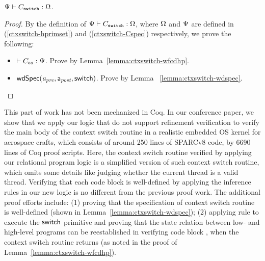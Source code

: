 \begin{theorem}
    \em
    ${\Psi} \vdash {C_{\texttt{switch}}} : {\Omega}$.
\end{theorem}
\begin{proof}
    By the definition of
    ${\Psi} \vdash {C_{\texttt{switch}}} : {\Omega}$,
    where $\Omega$ and $\Psi{}$ are defined in
    (\ref{ctxswitch-hprimset}) and (\ref{ctxswitch-Cspec})
    respectively, we prove the following:
    \begin{itemize}
        \item $\vdash {C_{\text{as}}} : {\Psi{}}$.
            Prove by Lemma~\ref{lemma:ctxswitch-wfcdhp}.
        \item $\textsf{wdSpec}({\textit{a}_\textit{pre}}, {\mathsf{a}_{\textit{post}}}, {\mathsf{switch}})$.
            Prove by Lemma ~\ref{lemma:ctxswitch-wdspec}.
    \end{itemize}
\end{proof}

This part of work has not been mechanized in Coq.
In our conference paper, we show that
we apply our logic that do not support
refinement verification to verify
the main body of the context switch routine in
a realistic embedded OS kernel for aerospace crafts,
which consists of around 250 lines of SPARCv8 code,
by 6690 lines of Coq proof scripts. Here, the
context switch routine verified by applying our
relational program logic is a
simplified version of such context switch routine,
which omits some details like judging whether the
current thread is a valid thread.
Verifying that each code block is well-defined
by applying the inference rules in our new logic is
no different from the previous proof work.
The additional proof efforts include:
(1) proving that the specification of context
switch routine is well-defined (shown in
Lemma~\ref{lemma:ctxswitch-wdspec});
(2) applying  rule to execute
the $\mathsf{switch}$ primitive and proving that the state
relation between low- and high-level programs
can be reestablished in verifying code block
\SwitchNewTask{}, when the context switch routine
returns (as noted in the proof of
Lemma~\ref{lemma:ctxswitch-wfcdhp}).

